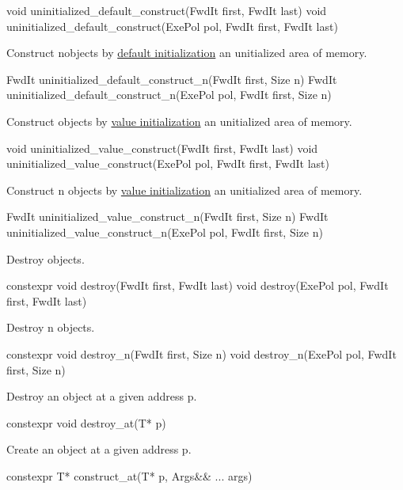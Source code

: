 \begin{cpp}
void uninitialized_default_construct(FwdIt first, FwdIt last)
void uninitialized_default_construct(ExePol pol, FwdIt first, FwdIt last)
\end{cpp}

Construct nobjects by \href{https://en.cppreference.com/w/cpp/language/default_initialization}{default initialization} an unitialized area of memory.

\begin{cpp}
FwdIt uninitialized_default_construct_n(FwdIt first, Size n)
FwdIt uninitialized_default_construct_n(ExePol pol, FwdIt first, Size n)
\end{cpp}

Construct objects by \href{https://en.cppreference.com/w/cpp/language/value_initialization}{value initialization} an unitialized area of memory.

\begin{cpp}
void uninitialized_value_construct(FwdIt first, FwdIt last)
void uninitialized_value_construct(ExePol pol, FwdIt first, FwdIt last)
\end{cpp}

Construct n objects by \href{https://en.cppreference.com/w/cpp/language/value_initialization}{value initialization} an unitialized area of memory.

\begin{cpp}
FwdIt uninitialized_value_construct_n(FwdIt first, Size n)
FwdIt uninitialized_value_construct_n(ExePol pol, FwdIt first, Size n)
\end{cpp}

Destroy objects.

\begin{cpp}
constexpr void destroy(FwdIt first, FwdIt last)
void destroy(ExePol pol, FwdIt first, FwdIt last)
\end{cpp}

Destroy n objects.

\begin{cpp}
constexpr void destroy_n(FwdIt first, Size n)
void destroy_n(ExePol pol, FwdIt first, Size n)
\end{cpp}

Destroy an object at a given address p.

\begin{cpp}
constexpr void destroy_at(T* p)
\end{cpp}

Create an object at a given address p.

\begin{cpp}
constexpr T* construct_at(T* p, Args&& ... args)
\end{cpp}












